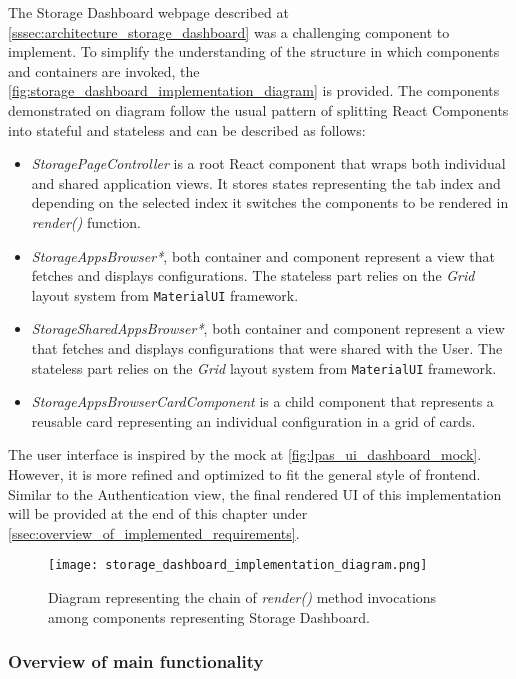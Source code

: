 The Storage Dashboard webpage described at \autoref{sssec:architecture_storage_dashboard} was a challenging component to implement. To simplify the understanding of the structure in which components and containers are invoked, the \autoref{fig:storage_dashboard_implementation_diagram} is provided. The components demonstrated on diagram follow the usual pattern of splitting React Components into stateful and stateless and can be described as follows:
\begin{itemize}
    \item \textit{StoragePageController} is a root React component that wraps both individual and shared application views. It stores states representing the tab index and depending on the selected index it switches the components to be rendered in \textit{render()} function.
    \item \textit{StorageAppsBrowser*}, both container and component represent a view that fetches and displays \lpa{} configurations. The stateless part relies on the \textit{Grid} layout system from \texttt{MaterialUI} framework.
    \item \textit{StorageSharedAppsBrowser*}, both container and component represent a view that fetches and displays \lpa{} configurations that were shared with the User. The stateless part relies on the \textit{Grid} layout system from \texttt{MaterialUI} framework.
    \item \textit{StorageAppsBrowserCardComponent} is a child component that represents a reusable card representing an individual \lpa{} configuration in a grid of cards.
\end{itemize}

The user interface is inspired by the mock at \autoref{fig:lpas_ui_dashboard_mock}. However, it is more refined and optimized to fit the general style of \lpa{} frontend. Similar to the Authentication view, the final rendered UI of this implementation will be provided at the end of this chapter under \autoref{ssec:overview_of_implemented_requirements}.

\begin{figure}[h]
\centering
\texttt{[image: storage\_dashboard\_implementation\_diagram.png]}
\caption{Diagram representing the chain of \textit{render()} method invocations among components representing Storage Dashboard.}
\label{fig:storage_dashboard_implementation_diagram}
\end{figure}

\subsubsection{Overview of main functionality}

